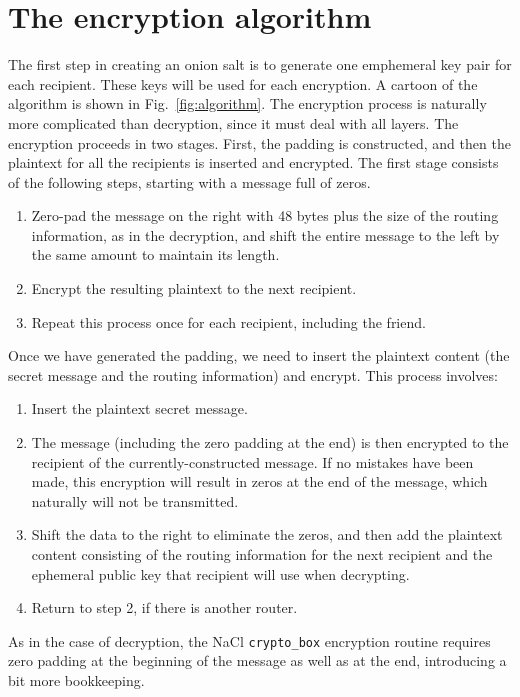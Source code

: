 \documentclass[letterpaper,twocolumn,amsmath,amssymb,pre,aps,10pt]{revtex4-1}
\begin{document}
\section{The encryption algorithm}

The first step in creating an onion salt is to generate one emphemeral
key pair for each recipient.  These keys will be used for each
encryption.  A cartoon of the algorithm is shown in
Fig.~\ref{fig:algorithm}.  The encryption process is naturally more
complicated than decryption, since it must deal with all layers.  The
encryption proceeds in two stages.  First, the padding is constructed,
and then the plaintext for all the recipients is inserted and
encrypted.  The first stage consists of the following steps, starting
with a message full of zeros.
\begin{enumerate}
\item Zero-pad the message on the right with 48 bytes plus the size of
  the routing information, as in the decryption, and shift the entire
  message to the left by the same amount to maintain its length.
\item Encrypt the resulting plaintext to the next recipient.
\item Repeat this process once for each recipient, including the
  friend.
\end{enumerate}
Once we have generated the padding, we need to insert the plaintext
content (the secret message and the routing information) and encrypt.
This process involves:
\begin{enumerate}
\item Insert the plaintext secret message.
\item The message (including the zero padding at the end) is then
  encrypted to the recipient of the currently-constructed message.  If
  no mistakes have been made, this encryption will result in zeros at
  the end of the message, which naturally will not be transmitted.
\item Shift the data to the right to eliminate the zeros, and then add
  the plaintext content consisting of the routing information for the
  next recipient and the ephemeral public key that recipient will use
  when decrypting.
\item Return to step 2, if there is another router.
\end{enumerate}
As in the case of decryption, the NaCl \texttt{crypto\_box} encryption
routine requires zero padding at the beginning of the message as well
as at the end, introducing a bit more bookkeeping.
\end{document}
